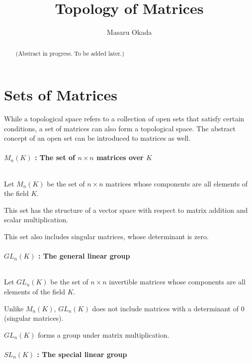 \documentclass[uplatex,a4j,12pt,dvipdfmx]{jsarticle}
\title{
Topology of Matrices
}
\author{
Masaru Okada
}
\begin{document}
\maketitle


\begin{abstract}
	(Abstract in progress. To be added later.)
\end{abstract}

\section{Sets of Matrices}

While a topological space refers to a collection of open sets that satisfy certain conditions, a set of matrices can also form a topological space.
The abstract concept of an open set can be introduced to matrices as well.

\paragraph{$M_{n}(K)$ : The set of $n \times n$ matrices over $K$}

${}$

Let $M_{n}(K)$ be the set of $n \times n$ matrices whose components are all elements of the field $K$.

This set has the structure of a vector space with respect to matrix addition and scalar multiplication.

This set also includes singular matrices, whose determinant is zero.

\paragraph{$GL_{n}(K)$ : The general linear group}

${}$

Let $GL_{n}(K)$ be the set of $n \times n$ invertible matrices whose components are all elements of the field $K$.

Unlike $M_{n}(K)$, $GL_{n}(K)$ does not include matrices with a determinant of 0 (singular matrices).

$GL_{n}(K)$ forms a group under matrix multiplication.

\paragraph{$SL_{n}(K)$ : The special linear group}

${}$
\end{document}
